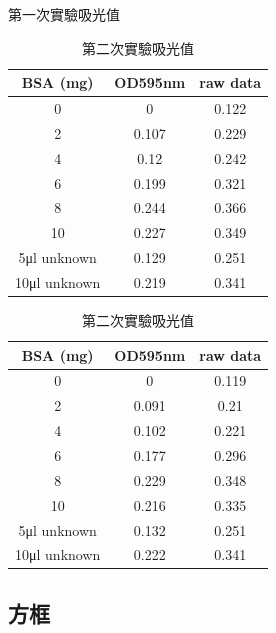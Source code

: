 \begin{table}[ht]%
  \begin{minipage}{.5\textwidth}
    \caption{第一次實驗吸光值}
      \label{tab:1}
    \centering
      \begin{tabular}[t]{ccc}
        \toprule
        BSA (mg)&OD595nm&raw data\\
        \midrule
  0&0&0.122\\
  2&0.107&0.229\\
  4&0.12&0.242\\
  6&0.199&0.321\\
  8&0.244&0.366\\
  10&0.227&0.349\\
  5μl unknown&0.129&0.251\\
  10μl unknown&0.219&0.341\\
  
        \bottomrule
      
      \end{tabular}
  \end{minipage}
  \begin{minipage}{.5\textwidth}
  \caption{第二次實驗吸光值}
  \label{tab:2}
    \centering
      \begin{tabular}[t]{ccc}
        \toprule
        BSA (mg)&OD595nm&raw data\\
        \midrule
  0&0&0.119\\
  2&0.091&0.21\\
  4&0.102&0.221\\
  6&0.177&0.296\\
  8&0.229&0.348\\
  10&0.216&0.335\\
  5μl unknown&0.132&0.251\\
  10μl unknown&0.222&0.341\\
        \bottomrule
      
      \end{tabular}
  \end{minipage}
  \end{table}

\subsection{方框}

